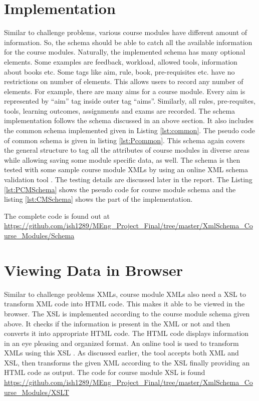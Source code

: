 \documentclass[11pt,letterpaper]{report}
\begin{document}
\section{Implementation}
Similar to challenge problems, various course modules have different amount of information. So, the schema should be able to catch all the available information for the course modules. Naturally, the implemented schema has many optional elements. Some examples are feedback, workload, allowed tools, information about books etc. Some tags like aim, rule, book, pre-requisites etc. have no restrictions on number of elements. This allows users to record any number of elements. For example, there are many aims for a course module. Every aim is represented by ``aim'' tag inside outer tag ``aims''. Similarly, all rules, pre-requites, tools, learning outcomes, assignments and exams are recorded.    
The schema implementation follows the schema discussed in an above section. It also includes the common schema implemented given in Listing \ref{lst:common}. The pseudo code of common schema is given in listing \ref{lst:Pcommon}. This schema again covers the general structure to tag all the attributes of course modules in diverse areas while allowing saving some module specific data, as well. The schema is then tested with some sample course module XMLs by using an online XML schema validation tool \cite{olXSD}. The testing details are discussed later in the report.  The Listing \ref{lst:PCMSchema} shows the pseudo code for course module schema and the listing \ref{lst:CMSchema} shows the part of the implementation.
 
The complete code is found out at \url{https://github.com/ish1289/MEng_Project_Final/tree/master/XmlSchema_Course_Modules/Schema}

 

\section{Viewing Data in Browser}
Similar to challenge problems XMLs, course module XMLs also need a XSL to transform XML code into HTML code. This makes it able to be viewed in the browser. The XSL is implemented according to the course module schema given above. It checks if the information is present in the XML or not and then converts it into appropriate HTML code. The HTML code displays information in an eye pleasing and organized format. An online tool is used to transform XMLs using this XSL \cite{olXSL}. As discussed earlier, the tool accepts both XML and XSL, then transforms the given XML according to the XSL finally providing an HTML code as output. The code for course module XSL is found \url{https://github.com/ish1289/MEng_Project_Final/tree/master/XmlSchema_Course_Modules/XSLT}
\end{document}
